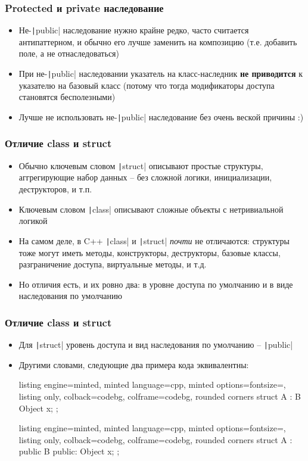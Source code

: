 \documentclass[10pt]{beamer}
\begin{document}
\begin{frame}[fragile]
\frametitle{Protected и private наследование}
\begin{itemize}
\item Не-\texttt|public| наследование нужно крайне редко, часто считается антипаттерном, и обычно его лучше заменить на композицию (т.е. добавить поле, а не отнаследоваться)
\pause
\item При не-\texttt|public| наследовании указатель на класс-наследник \textbf{не приводится} к указателю на базовый класс (потому что тогда модификаторы доступа становятся бесполезными)
\pause
\item Лучше не использовать не-\texttt|public| наследование без очень веской причины :)
\end{itemize}
\end{frame}

\begin{frame}[fragile]
\frametitle{Отличие class и struct}
\begin{itemize}
\item Обычно ключевым словом \texttt|struct| описывают простые структуры, аггрегирующие набор данных -- без сложной логики, инициализации, деструкторов, и т.п.
\pause
\item Ключевым словом \texttt|class| описывают сложные объекты с нетривиальной логикой
\pause
\item На самом деле, в C++ \texttt|class| и \texttt|struct| \textit{почти} не отличаются: структуры тоже могут иметь методы, конструкторы, деструкторы, базовые классы, разграничение доступа, виртуальные методы, и т.д.
\pause
\item Но отличия есть, и их ровно два: в уровне доступа по умолчанию и в виде наследования по умолчанию
\end{itemize}
\end{frame}

\begin{frame}[fragile]
\frametitle{Отличие class и struct}
\begin{itemize}
\item Для \texttt|struct| уровень доступа и вид наследования по умолчанию -- \texttt|public|
\pause
\item Другими словами, следующие два примера кода эквивалентны:
\begin{tcblisting}{listing engine=minted, minted language=cpp, minted options={fontsize=\scriptsize}, listing only, colback=codebg, colframe=codebg, rounded corners}
struct A : B {
  Object x;
};
\end{tcblisting}
\begin{tcblisting}{listing engine=minted, minted language=cpp, minted options={fontsize=\scriptsize}, listing only, colback=codebg, colframe=codebg, rounded corners}
struct A : public B {
public:
  Object x;
};
\end{tcblisting}
\end{itemize}
\end{frame}
\end{document}
